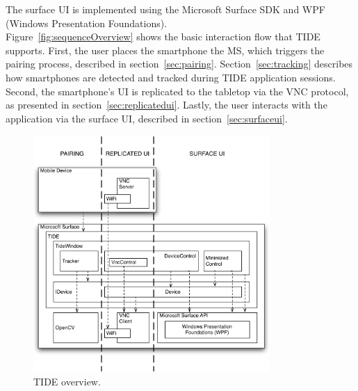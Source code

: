 The surface UI is implemented using the Microsoft Surface SDK and WPF (Windows Presentation Foundations).
\\
\linebreak
Figure~\ref{fig:sequenceOverview} shows the basic interaction flow that TIDE supports.
First, the user places the smartphone the MS, which triggers the pairing process, described in section~\ref{sec:pairing}.
Section~\ref{sec:tracking} describes how smartphones are detected and tracked during TIDE application sessions.
Second, the smartphone's UI is replicated to the tabletop via the VNC protocol, as presented in section~\ref{sec:replicatedui}.
Lastly, the user interacts with the application via the surface UI, described in section~\ref{sec:surfaceui}.

\begin{figure}[t]
  \centering
    \includegraphics[width=0.8\textwidth]{images/overview}
    \caption{TIDE overview.}
    \label{fig:overview}
\end{figure}

